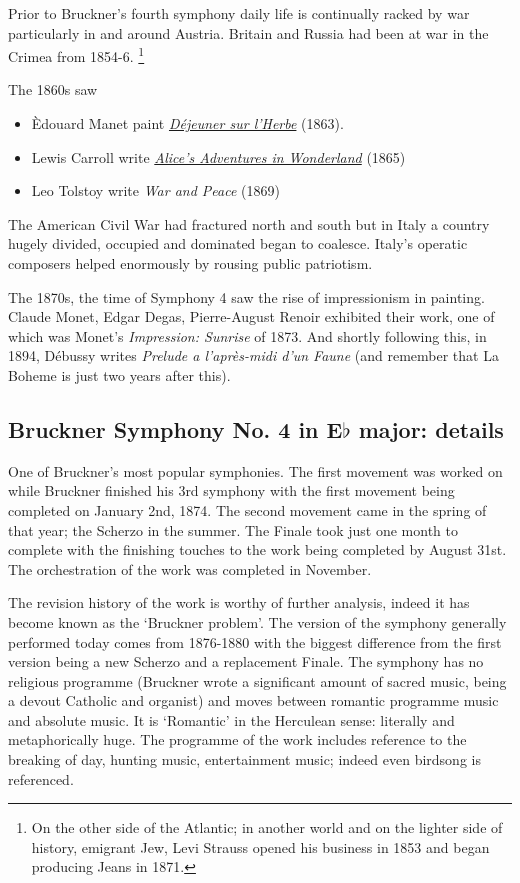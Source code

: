 Prior to Bruckner's fourth symphony daily life is continually racked by war particularly in and around Austria. Britain and Russia had been at war in the Crimea from 1854-6. \footnote{On the other side of the Atlantic; in another world and on the lighter side of history, emigrant Jew, Levi Strauss opened his business in 1853 and began producing Jeans in 1871.}  

The 1860s saw 
\begin{itemize}
\item \`Edouard Manet paint \textit{\href{https://www.khanacademy.org/humanities/becoming-modern/avant-garde-france/realism/v/manet-le-d-jeuner-sur-l-herbe-luncheon-on-the-grass-1863}{D\'ejeuner sur l'Herbe}} (1863).
\item Lewis Carroll write \textit{\href{http://www.gutenberg.org/files/11/11-h/11-h.htm}{Alice's Adventures in Wonderland}} (1865)
\item Leo Tolstoy write \textit{War and Peace} (1869)
\end{itemize}

The American Civil War had fractured north and south but in Italy a country hugely divided, occupied and dominated began to coalesce. Italy's operatic composers helped enormously by rousing public patriotism.

The 1870s, the time of Symphony 4 saw the rise of impressionism in painting. Claude Monet, Edgar Degas, Pierre-August Renoir exhibited their work, one of which was Monet's \textit{Impression: Sunrise} of 1873. 
And shortly following this, in 1894, D\'ebussy writes \textit{Prelude a l'apr\`es-midi d'un Faune} (and remember that La Boheme is just two years after this). 

\subsection{Bruckner Symphony No. 4 in E$\flat$ major: details} 

One of Bruckner's most popular symphonies. The first movement was worked on while Bruckner finished his 3rd symphony with the first movement being completed on January 2nd, 1874. The second movement came in the spring of that year; the Scherzo in the summer. The Finale took just one month to complete with the finishing touches to the work being completed by August 31st. The orchestration of the work was completed in November. 

The revision history of the work is worthy of further analysis, indeed it has become known as the `Bruckner problem'. The version of the symphony generally performed today comes from 1876-1880 with the biggest difference from the first version being a new Scherzo and a replacement Finale. The symphony has no religious programme (Bruckner wrote a significant amount of sacred music, being a devout Catholic and organist) and moves between romantic programme music and absolute music. It is `Romantic' in the Herculean sense: literally and metaphorically huge. The programme of the work includes reference to the breaking of day, hunting music, entertainment music; indeed even birdsong is referenced. 

